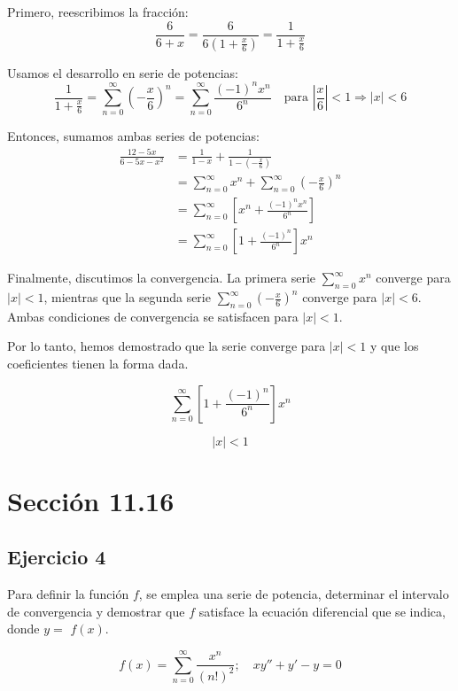 \documentclass{article}
\begin{document}
    Primero, reescribimos la fracción:
    $$
    \frac{6}{6+x} = \frac{6}{6(1 + \frac{x}{6})} = \frac{1}{1 + \frac{x}{6}}
    $$

    Usamos el desarrollo en serie de potencias:
    $$
    \frac{1}{1 + \frac{x}{6}} = \sum_{n=0}^{\infty} \left(-\frac{x}{6}\right)^{n} = \sum_{n=0}^{\infty}\frac{(-1)^{n} x^{n}}{6^{n}} \quad \text{para } \left| \frac{x}{6} \right| < 1 \Rightarrow |x| < 6
    $$

    Entonces, sumamos ambas series de potencias:
    $$
    \begin{aligned}
    \frac{12-5 x}{6-5 x-x^{2}} & =\frac{1}{1-x}+\frac{1}{1-\left(-\frac{x}{6}\right)} \\
    & =\sum_{n=0}^{\infty} x^{n}+\sum_{n=0}^{\infty}\left(-\frac{x}{6}\right)^{n} \\
    & =\sum_{n=0}^{\infty}\left[x^{n}+\frac{(-1)^{n} x^{n}}{6^{n}}\right] \\
    & =\sum_{n=0}^{\infty}\left[1+\frac{(-1)^{n}}{6^{n}}\right] x^{n}
    \end{aligned}
    $$

    Finalmente, discutimos la convergencia. La primera serie \(\sum_{n=0}^{\infty} x^{n}\) converge para \( |x| < 1 \), mientras que la segunda serie \(\sum_{n=0}^{\infty} \left(-\frac{x}{6}\right)^{n} \) converge para \(|x| < 6\). Ambas condiciones de convergencia se satisfacen para \( |x| < 1 \).

    Por lo tanto, hemos demostrado que la serie converge para \(|x| < 1\) y que los coeficientes tienen la forma dada.

    \[
    \sum_{n=0}^{\infty}\left[1+\frac{(-1)^{n}}{6^{n}}\right] x^{n}
    \]

    \[
    |x| < 1
    \]

    \section*{Sección 11.16}
    \subsection*{Ejercicio 4}

    Para definir la función $f$, se emplea una serie de potencia, determinar el intervalo de convergencia y demostrar que $f$ satisface la ecuación diferencial que se indica, donde $y=$ $f(x)$.

    $$
    f(x) = \sum_{n=0}^{\infty} \frac{x^n}{(n!)^2}; \quad x y'' + y' - y = 0
    $$
\end{document}
